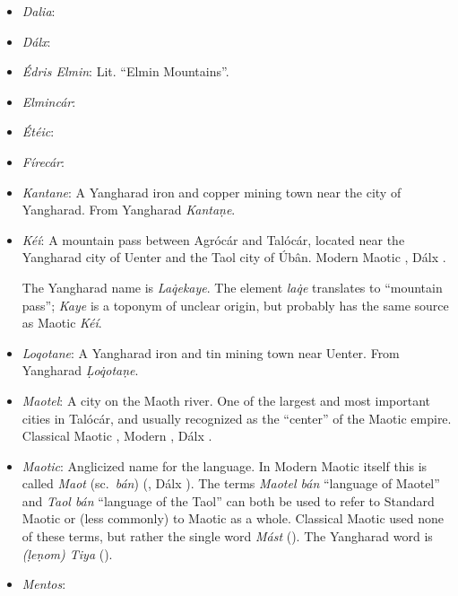 \documentclass{article}
\begin{document}
\begin{itemize}
 \item \textit{Dalia}:

 \item \textit{Dálx}:

 \item \textit{Édris Elmin}: Lit. ``Elmin Mountains''.

 \item \textit{Elmincár}:

 \item \textit{Étéic}:

 \item \textit{Fírecár}:

 \item \textit{Kantane}: A Yangharad iron and copper mining town near the city of Yangharad. From Yangharad \textit{Kanta\d{n}e}.

 \item \textit{Kéí}: A mountain pass between Agrócár and Talócár, located near the Yangharad city of Uenter and the Taol city of Úbân. Modern Maotic , Dálx .

 The Yangharad name is \textit{La\.{q}ekaye}. The element \textit{la\.{q}e} translates to ``mountain pass''; \textit{Kaye} is a toponym of unclear origin, but probably has the same source as Maotic \textit{Kéí}.

 \item \textit{Loqotane}: A Yangharad iron and tin mining town near Uenter. From Yangharad \textit{\d{L}o\.{q}ota\d{n}e}.

 \item \textit{Maotel}: A city on the Maoth river. One of the largest and most important cities in Talócár, and usually recognized as the ``center'' of the Maotic empire. Classical Maotic , Modern , Dálx .

 \item \textit{Maotic}: Anglicized name for the language. In Modern Maotic itself this is called \textit{Maot} (sc.\ \textit{bán}) (, Dálx ). The terms \textit{Maotel bán} ``language of Maotel'' and \textit{Taol bán} ``language of the Taol'' can both be used to refer to Standard Maotic or (less commonly) to Maotic as a whole. Classical Maotic used none of these terms, but rather the single word \textit{Mást} (). The Yangharad word is \textit{(\d{l}e\d{n}om) Tiya} ().

 \item \textit{Mentos}:


\end{itemize}
\end{document}
